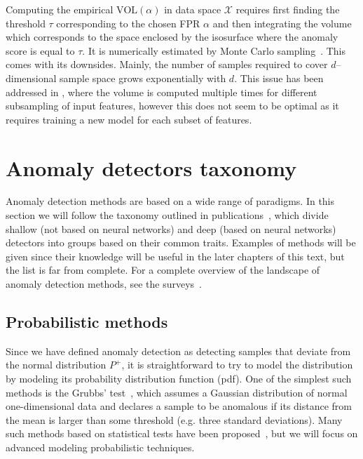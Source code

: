 Computing the empirical $\text{VOL}(\alpha)$ in data space $\mathcal{X}$ requires first finding the threshold $\tau$ corresponding to the chosen FPR $\alpha$ and then integrating the volume which corresponds to the space enclosed by the isosurface where the anomaly score is equal to $\tau$. It is numerically estimated by Monte Carlo sampling~\cite{robert1999monte}. This comes with its downsides. Mainly, the number of samples required to cover $d$--dimensional sample space grows exponentially with $d$. This issue has been addressed in \cite{goix2016evaluate}, where the volume is computed multiple times for different subsampling of input features, however this does not seem to be optimal as it requires training a new model for each subset of features.


\section{Anomaly detectors taxonomy} \label{sec:taxonomy}
Anomaly detection methods are based on a wide range of paradigms. In this section we will follow the taxonomy outlined in publications~\cite{pimentel2014review, ruff2020unifying}, which divide shallow (not based on neural networks) and deep (based on neural networks) detectors into groups based on their common traits. Examples of methods will be given since their knowledge will be useful in the later chapters of this text, but the list is far from complete. For a complete overview of the landscape of anomaly detection methods, see the surveys~\cite{pimentel2014review, campos2016evaluation, goldstein2016comparative, moustafa2019holistic, kwon2019survey, fernandes2019comprehensive, wang2019progress, chalapathy2019deep,ruff2020unifying}.

\subsection{Probabilistic  methods} \label{sec:probabilistic_models}
Since we have defined anomaly detection as detecting samples that deviate from the normal distribution $P^+$, it is straightforward to try to model the distribution by modeling its probability distribution function (pdf). One of the simplest such methods is the Grubbs' test~\cite{grubbs1969procedures}, which assumes a Gaussian distribution of normal one-dimensional data and declares a sample to be anomalous if its distance from the mean is larger than some threshold (e.g. three standard deviations). Many such methods based on statistical tests have been proposed~\cite{barnett1994outliers}, but we will focus on advanced modeling probabilistic techniques.

